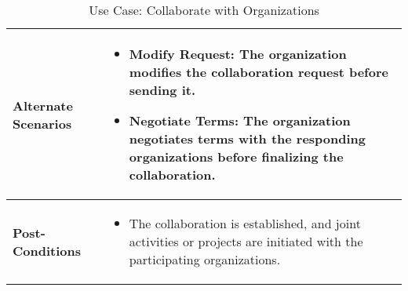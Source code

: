 \begin{table}[!ht]
\begin{tabularx}{\textwidth}{|l|X|}
        \hline
        \textbf{Alternate Scenarios} & 
        \begin{itemize}[label=--,itemsep=0pt]
            \item Modify Request: The organization modifies the collaboration request before sending it.
            \item Negotiate Terms: The organization negotiates terms with the responding organizations before finalizing the collaboration.
        \end{itemize} \\
        \hline
        \textbf{Post-Conditions} & 
        \begin{itemize}[label=--,itemsep=0pt]
            \item The collaboration is established, and joint activities or projects are initiated with the participating organizations.
        \end{itemize} \\
        \hline
    \end{tabularx}
    \caption{Use Case: Collaborate with Organizations}
    \label{tab:use-case-collaborate-with-organizations}
\end{table}



